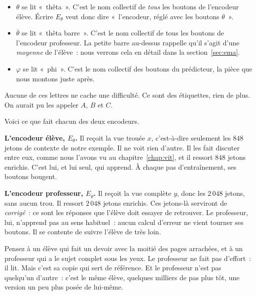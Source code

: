 \begin{notation}
\begin{itemize}
  \item $\theta$ se lit «~thêta~». C'est le nom collectif de \emph{tous} les
        boutons de l'encodeur élève. Écrire $E_{\theta}$ veut donc dire
        «~l'encodeur, réglé avec les boutons $\theta$~».
  \item $\bar{\theta}$ se lit «~thêta barre~». C'est le nom collectif de
        tous les boutons de l'encodeur professeur. La petite barre au-dessus
        rappelle qu'il s'agit d'une \emph{moyenne} de l'élève~: nous verrons
        cela en détail dans la section~\ref{sec:ema}.
  \item $\varphi$ se lit «~phi~». C'est le nom collectif des boutons du
        prédicteur, la pièce que nous montons juste après.
\end{itemize}
Aucune de ces lettres ne cache une difficulté. Ce sont des étiquettes, rien
de plus. On aurait pu les appeler $A$, $B$ et $C$.
\end{notation}

Voici ce que fait chacun des deux encodeurs.

\textbf{L'encodeur élève, $E_{\theta}$.} Il reçoit la vue trouée $x$,
c'est-à-dire seulement les $848$ jetons de contexte de notre exemple. Il ne
voit rien d'autre. Il les fait discuter entre eux, comme nous l'avons vu au
chapitre~\ref{chap:vit}, et il ressort $848$ jetons enrichis. C'est lui, et
lui seul, qui apprend. À chaque pas d'entraînement, ses boutons bougent.

\textbf{L'encodeur professeur, $E_{\bar{\theta}}$.} Il reçoit la vue
complète $y$, donc les $2\,048$ jetons, sans aucun trou. Il ressort $2\,048$
jetons enrichis. Ces jetons-là serviront de \emph{corrigé}~: ce sont les
réponses que l'élève doit essayer de retrouver. Le professeur, lui,
n'apprend pas au sens habituel~: aucun calcul d'erreur ne vient tourner ses
boutons. Il se contente de suivre l'élève de très loin.

\begin{intuition}
Pensez à un élève qui fait un devoir avec la moitié des pages arrachées, et
à un professeur qui a le sujet complet sous les yeux. Le professeur ne fait
pas d'effort~: il lit. Mais c'est sa copie qui sert de référence. Et le
professeur n'est pas quelqu'un d'autre~: c'est le même élève, quelques
milliers de pas plus tôt, une version un peu plus posée de lui-même.
\end{intuition}

